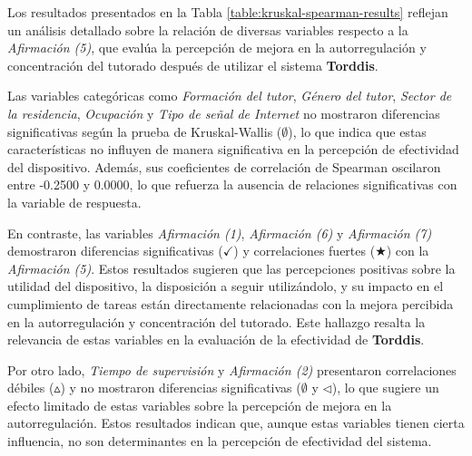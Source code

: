 				Los resultados presentados en la Tabla \ref{table:kruskal-spearman-results} reflejan un análisis detallado sobre la relación de diversas variables respecto a la \textit{Afirmación (5)}, que evalúa la percepción de mejora en la autorregulación y concentración del tutorado después de utilizar el sistema \textbf{Torddis}.
				
				Las variables categóricas como \textit{Formación del tutor}, \textit{Género del tutor}, \textit{Sector de la residencia}, \textit{Ocupación} y \textit{Tipo de señal de Internet} no mostraron diferencias significativas según la prueba de Kruskal-Wallis (\(\emptyset\)), lo que indica que estas características no influyen de manera significativa en la percepción de efectividad del dispositivo. Además, sus coeficientes de correlación de Spearman oscilaron entre -0.2500 y 0.0000, lo que refuerza la ausencia de relaciones significativas con la variable de respuesta.
				
				En contraste, las variables \textit{Afirmación (1)}, \textit{Afirmación (6)} y \textit{Afirmación (7)} demostraron diferencias significativas (\(\checkmark\)) y correlaciones fuertes (\(\bigstar\)) con la \textit{Afirmación (5)}. Estos resultados sugieren que las percepciones positivas sobre la utilidad del dispositivo, la disposición a seguir utilizándolo, y su impacto en el cumplimiento de tareas están directamente relacionadas con la mejora percibida en la autorregulación y concentración del tutorado. Este hallazgo resalta la relevancia de estas variables en la evaluación de la efectividad de \textbf{Torddis}.
				
				Por otro lado, \textit{Tiempo de supervisión} y \textit{Afirmación (2)} presentaron correlaciones débiles (\(\vartriangle\)) y no mostraron diferencias significativas (\(\emptyset\) y \(\triangleleft\)), lo que sugiere un efecto limitado de estas variables sobre la percepción de mejora en la autorregulación. Estos resultados indican que, aunque estas variables tienen cierta influencia, no son determinantes en la percepción de efectividad del sistema.
		 